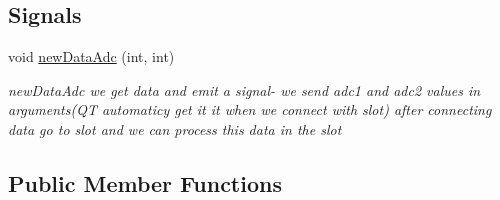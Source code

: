 \subsection*{Signals}
\begin{DoxyCompactItemize}
\item 
void \hyperlink{class_e_s_p32data_ade36e3d9b929614a79d1a24491c18185}{new\+Data\+Adc} (int, int)
\begin{DoxyCompactList}\small\item\em new\+Data\+Adc we get data and emit a signal-\/ we send adc1 and adc2 values in arguments(\+Q\+T automaticy get it it when we connect with slot) after connecting data go to slot and we can process this data in the slot \end{DoxyCompactList}\end{DoxyCompactItemize}
\subsection*{Public Member Functions}

